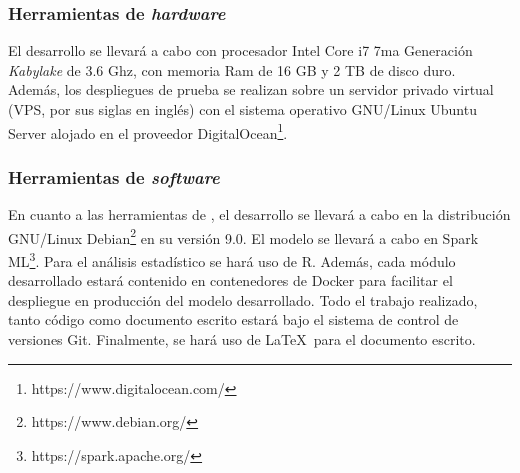 \subsubsection*{Herramientas de \textit{hardware}}
El desarrollo se llevará a cabo con procesador Intel Core i7 7ma Generación \textit{Kabylake} de 3.6 Ghz, con memoria Ram de 16 GB y 2 TB de disco duro. Además, los despliegues de prueba se realizan sobre un servidor privado virtual (VPS, por sus siglas en inglés) con el sistema operativo GNU/Linux Ubuntu Server alojado en el proveedor DigitalOcean\footnote{https://www.digitalocean.com/}.

\subsubsection*{Herramientas de \textit{software}}
En cuanto a las herramientas de , el desarrollo se llevará a cabo en la distribución GNU/Linux Debian\footnote{https://www.debian.org/} en su versión 9.0. El modelo se llevará a cabo en Spark ML\footnote{https://spark.apache.org/}. Para el análisis estadístico se hará uso de R. Además, cada módulo desarrollado estará contenido en contenedores de Docker para facilitar el despliegue en producción del modelo desarrollado. Todo el trabajo realizado, tanto código como documento escrito estará bajo el sistema de control de versiones Git. Finalmente, se hará uso de \LaTeX\ para el documento escrito.

%
